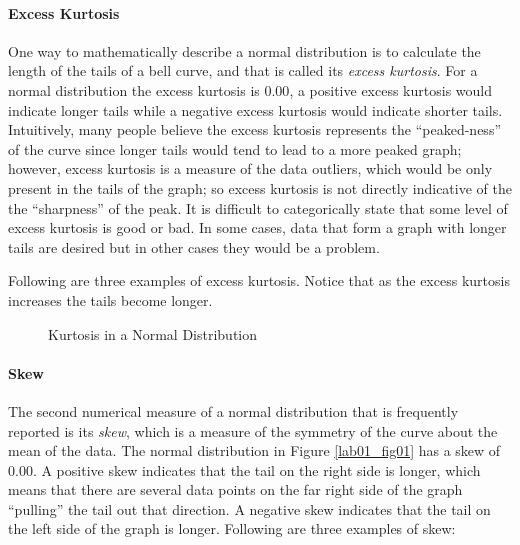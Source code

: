 \paragraph{Excess Kurtosis}
One way to mathematically describe a normal distribution is to calculate the length of the tails of a bell curve, and that is called its \textit{excess kurtosis}. For a normal distribution the excess kurtosis is $ 0.00 $, a positive excess kurtosis would indicate longer tails while a negative excess kurtosis would indicate shorter tails. Intuitively, many people believe the excess kurtosis represents the ``peaked-ness'' of the curve since longer tails would tend to lead to a more peaked graph; however, excess kurtosis is a measure of the data outliers, which would be only present in the tails of the graph; so excess kurtosis is not directly indicative of the the ``sharpness'' of the peak. It is difficult to categorically state that some level of excess kurtosis is good or bad. In some cases, data that form a graph with longer tails are desired but in other cases they would be a problem.

Following are three examples of excess kurtosis. Notice that as the excess kurtosis increases the tails become longer. 

\begin{figure}[H]
  \begin{center}
  \end{center}
  \caption{Kurtosis in a Normal Distribution}
  \label{lab01_fig10}  
\end{figure}

\paragraph{Skew}
The second numerical measure of a normal distribution that is frequently reported is its \textit{skew}, which is a measure of the symmetry of the curve about the mean of the data. The normal distribution in Figure \ref{lab01_fig01} has a skew of $ 0.00 $. A positive skew indicates that the tail on the right side is longer, which means that there are several data points on the far right side of the graph ``pulling'' the tail out that direction. A negative skew indicates that the tail on the left side of the graph is longer. Following are three examples of skew:

